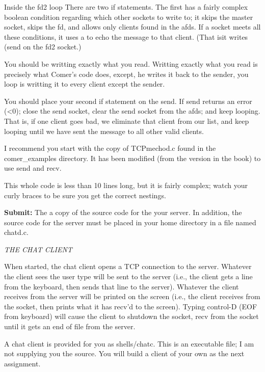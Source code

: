 Inside the {\ltt{}fd2} loop
There are two {\ltt{}if} statements.
The first has a fairly complex boolean condition regarding which
other sockets to write to; it skips the master socket,
skips the {\ltt{}fd}, and allows  only clients found in
the {\ltt{}afds}.
If a socket meets all these conditions, it uses a
to echo the message to that client.
(That isit writes ({\ltt{}send}
on the {\ltt{}fd2} socket.)

You should be writting exactly what you read.
Writting exactly what you read is precisely what Comer's code does,
except, he writes it back to the sender, you loop is writting
it to every client except the sender.

You should place your second {\ltt{}if} statement on the {\ltt{}send}.
If {\ltt{}send} returns an error ({\ltt{}<0}); close the send socket,
clear the send socket from the {\ltt{}afds}; and keep looping.
That is, if one client goes bad, we eliminate that client from
our list, and keep looping until we have sent the message to 
all other valid clients.

I recommend you start with the copy of
{\ltt{}TCPmechod.c} found in the {\ltt{}comer_examples} directory.
It has been modified (from the version in the book)
to use {\ltt{}send} and {\ltt{}recv}.

This whole code is less than 10 lines long, but it is fairly complex;
watch your curly braces to be sure you get the correct nestings.

{\bf Submit:} The a copy of the source code for the your server.
In addition,
the source code for the server must be placed in your home directory
in a file named {\ltt{}chatd.c}.

{\it THE CHAT CLIENT}

When started, the chat client opens a TCP connection to the server.
Whatever the client sees the user type will be sent to the server 
(i.e., the client gets a line from the keyboard, 
then sends that line to the server).
Whatever the client receives from the server will be printed on the screen
(i.e., the client receives from the socket, 
then prints what it has recv'd to the screen).
Typing control-D (EOF from keyboard) will cause the client to 
shutdown the socket, recv from the socket until it gets an end of file
from the server.

A chat client is provided for you as {\ltt{}shells/chatc}.
This is an executable file; I am not supplying you the source.
You will build a client of your own as the next assignment.

\bye
